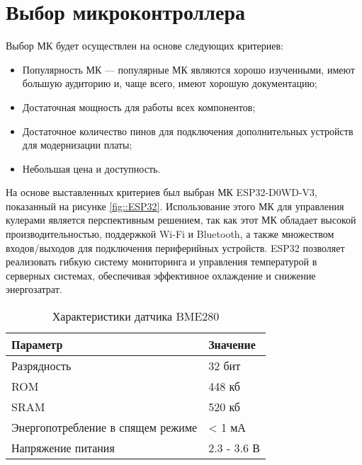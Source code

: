 \section {Выбор микроконтроллера}

Выбор МК будет осуществлен на основе следующих критериев:

\begin{itemize}

	\item Популярность МК --- популярные МК являются хорошо изученными, имеют большую аудиторию и, чаще всего, имеют хорошую документацию;
	
	\item Достаточная мощность для работы всех компонентов;
	
	\item Достаточное количество пинов для подключения дополнительных устройств для модернизации платы;

	\item Небольшая цена и доступность.
	
\end{itemize}

На основе выставленных критериев был выбран МК ESP32-D0WD-V3, показанный на рисунке \ref{fig::ESP32}. Использование этого МК для управления кулерами является перспективным решением, так как этот МК обладает высокой производительностью, поддержкой Wi-Fi и Bluetooth, а также множеством входов/выходов для подключения периферийных устройств. ESP32 позволяет реализовать гибкую систему мониторинга и управления температурой в серверных системах, обеспечивая эффективное охлаждение и снижение энергозатрат.


\begin{table}[h!]
	\centering
	\caption{Характеристики датчика BME280}
	\begin{tabular}{| m{9cm} | m{6cm} |}
		\hline
		Параметр & Значение \\ \hline
		Разрядность & 32 бит \\ \hline
		ROM & 448 кб \\ \hline
		SRAM & 520 кб \\ \hline
		Энергопотребление в спящем режиме & < 1 мА\\ \hline
		Напряжение питания & 2.3 - 3.6 В \\ \hline
	\end{tabular}
	\label{tab::TempSensorCharacteristics}
\end{table}